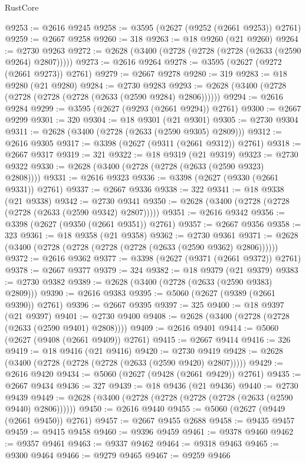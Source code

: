 \begin{lexlean}{RustCore}
\begin{coremodule}
@9253 := @2616 @9245
@9258 := @3595 (@2627 (@9252 (@2661 @9253)) @2761)
@9259 := @2667 @9258
@9260 := 318
@9263 := @18 @9260 (@21 @9260)
@9264 := @2730 @9263
@9272 := @2628 (@3400 (@2728 (@2728 (@2728 (@2633 (@2590 @9264) @2807)))))
@9273 := @2616 @9264
@9278 := @3595 (@2627 (@9272 (@2661 @9273)) @2761)
@9279 := @2667 @9278
@9280 := 319
@9283 := @18 @9280 (@21 @9280)
@9284 := @2730 @9283
@9293 := @2628 (@3400 (@2728 (@2728 (@2728 (@2728 (@2633 (@2590 @9284) @2806))))))
@9294 := @2616 @9284
@9299 := @3595 (@2627 (@9293 (@2661 @9294)) @2761)
@9300 := @2667 @9299
@9301 := 320
@9304 := @18 @9301 (@21 @9301)
@9305 := @2730 @9304
@9311 := @2628 (@3400 (@2728 (@2633 (@2590 @9305) @2809)))
@9312 := @2616 @9305
@9317 := @3398 (@2627 (@9311 (@2661 @9312)) @2761)
@9318 := @2667 @9317
@9319 := 321
@9322 := @18 @9319 (@21 @9319)
@9323 := @2730 @9322
@9330 := @2628 (@3400 (@2728 (@2728 (@2633 (@2590 @9323) @2808))))
@9331 := @2616 @9323
@9336 := @3398 (@2627 (@9330 (@2661 @9331)) @2761)
@9337 := @2667 @9336
@9338 := 322
@9341 := @18 @9338 (@21 @9338)
@9342 := @2730 @9341
@9350 := @2628 (@3400 (@2728 (@2728 (@2728 (@2633 (@2590 @9342) @2807)))))
@9351 := @2616 @9342
@9356 := @3398 (@2627 (@9350 (@2661 @9351)) @2761)
@9357 := @2667 @9356
@9358 := 323
@9361 := @18 @9358 (@21 @9358)
@9362 := @2730 @9361
@9371 := @2628 (@3400 (@2728 (@2728 (@2728 (@2728 (@2633 (@2590 @9362) @2806))))))
@9372 := @2616 @9362
@9377 := @3398 (@2627 (@9371 (@2661 @9372)) @2761)
@9378 := @2667 @9377
@9379 := 324
@9382 := @18 @9379 (@21 @9379)
@9383 := @2730 @9382
@9389 := @2628 (@3400 (@2728 (@2633 (@2590 @9383) @2809)))
@9390 := @2616 @9383
@9395 := @5060 (@2627 (@9389 (@2661 @9390)) @2761)
@9396 := @2667 @9395
@9397 := 325
@9400 := @18 @9397 (@21 @9397)
@9401 := @2730 @9400
@9408 := @2628 (@3400 (@2728 (@2728 (@2633 (@2590 @9401) @2808))))
@9409 := @2616 @9401
@9414 := @5060 (@2627 (@9408 (@2661 @9409)) @2761)
@9415 := @2667 @9414
@9416 := 326
@9419 := @18 @9416 (@21 @9416)
@9420 := @2730 @9419
@9428 := @2628 (@3400 (@2728 (@2728 (@2728 (@2633 (@2590 @9420) @2807)))))
@9429 := @2616 @9420
@9434 := @5060 (@2627 (@9428 (@2661 @9429)) @2761)
@9435 := @2667 @9434
@9436 := 327
@9439 := @18 @9436 (@21 @9436)
@9440 := @2730 @9439
@9449 := @2628 (@3400 (@2728 (@2728 (@2728 (@2728 (@2633 (@2590 @9440) @2806))))))
@9450 := @2616 @9440
@9455 := @5060 (@2627 (@9449 (@2661 @9450)) @2761)
@9457 := @2667 @9455 @2688
@9458 := @9435 @9457
@9459 := @9415 @9458
@9460 := @9396 @9459
@9461 := @9378 @9460
@9462 := @9357 @9461
@9463 := @9337 @9462
@9464 := @9318 @9463
@9465 := @9300 @9464
@9466 := @9279 @9465
@9467 := @9259 @9466

\end{coremodule}
\end{lexlean}
